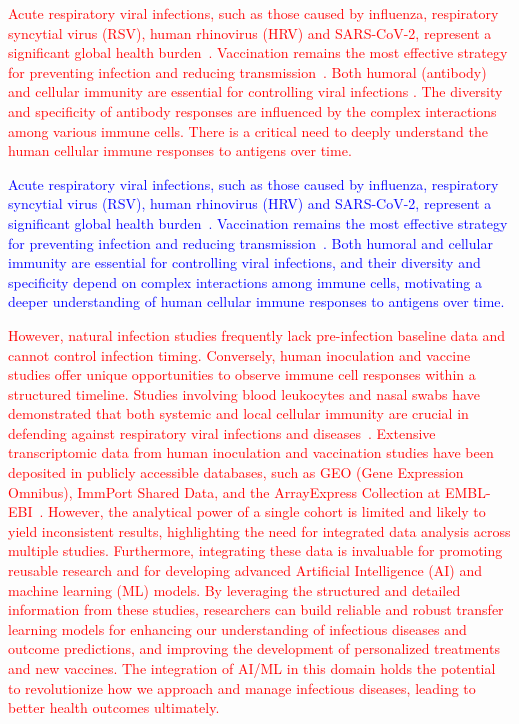 \documentclass[
  12pt]{article}
\newcommand{\delmark}[1]{\textcolor{red}{#1}}
\newcommand{\addmark}[1]{\textcolor{blue}{#1}}
\begin{document}
\delmark{Acute respiratory viral infections, such as those caused by influenza, respiratory syncytial virus (RSV), human rhinovirus (HRV) and SARS-CoV-2, represent a significant global health burden~\citep{bender2024global,chow2023effects,hodinka2016respiratory,simoes2015challenges}. Vaccination remains the most effective strategy for preventing infection and reducing transmission~\citep{gracca2023both,yaugel2022role,nehme2011relative}. Both humoral (antibody) and cellular immunity are essential for controlling viral infections . The diversity and specificity of antibody responses are influenced by the complex interactions among various immune cells. There is a critical need to deeply understand the human cellular immune responses to antigens over time.}

\medskip
\addmark{Acute respiratory viral infections, such as those caused by influenza, respiratory syncytial virus (RSV), human rhinovirus (HRV) and SARS-CoV-2, represent a significant global health burden~\citep{bender2024global,chow2023effects,hodinka2016respiratory,simoes2015challenges}. Vaccination remains the most effective strategy for preventing infection and reducing transmission~\citep{gracca2023both,yaugel2022role,nehme2011relative}. Both humoral and cellular immunity are essential for controlling viral infections, and their diversity and specificity depend on complex interactions among immune cells, motivating a deeper understanding of human cellular immune responses to antigens over time.}

\medskip
\delmark{However, natural infection studies frequently lack pre-infection baseline data and cannot control infection timing. Conversely, human inoculation and vaccine studies offer unique opportunities to observe immune cell responses within a structured timeline. Studies involving blood leukocytes and nasal swabs have demonstrated that both systemic and local cellular immunity are crucial in defending against respiratory viral infections and diseases~\citep{liu2016individualized,zaas2009gene,huang2011temporal,davenport2015transcriptomic,rosenheim2023sars,proud2008gene,muller2017development,habibi2020neutrophilic}. Extensive transcriptomic data from human inoculation and vaccination studies have been deposited in publicly accessible databases, such as GEO (Gene Expression Omnibus), ImmPort Shared Data, and the ArrayExpress Collection at EMBL-EBI~\citep{barrett2012ncbi,bhattacharya2018immport,parkinson2007arrayexpress}. However, the analytical power of a single cohort is limited and likely to yield inconsistent results, highlighting the need for integrated data analysis across multiple studies. Furthermore, integrating these data is invaluable for promoting reusable research and for developing advanced Artificial Intelligence (AI) and machine learning (ML) models. By leveraging the structured and detailed information from these studies, researchers can build reliable and robust transfer learning models for enhancing our understanding of infectious diseases and outcome predictions, and improving the development of personalized treatments and new vaccines. The integration of AI/ML in this domain holds the potential to revolutionize how we approach and manage infectious diseases, leading to better health outcomes ultimately.}
\end{document}
